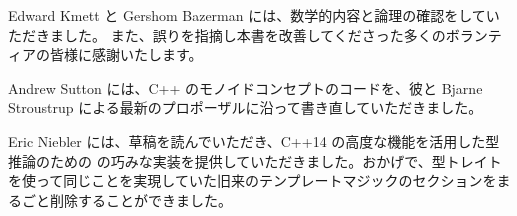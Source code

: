 \noindent
Edward Kmett と Gershom Bazerman には、数学的内容と論理の確認をしていただきました。
また、誤りを指摘し本書を改善してくださった多くのボランティアの皆様に感謝いたします。

\vspace{1.0em}
\noindent
Andrew Sutton には、C++ のモノイドコンセプトのコードを、彼と Bjarne Stroustrup による最新のプロポーザルに沿って書き直していただきました。

\vspace{1.0em}
\noindent
Eric Niebler には、草稿を読んでいただき、C++14 の高度な機能を活用した型推論のための  の巧みな実装を提供していただきました。おかげで、型トレイトを使って同じことを実現していた旧来のテンプレートマジックのセクションをまるごと削除することができました。
